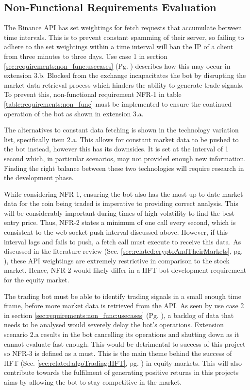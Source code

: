 \subsection{Non-Functional Requirements Evaluation}
\noindent The Binance API \cite{WEB:BINANCE_API:2018} has set weightings for fetch requests that accumulate between time intervals. This is to prevent constant spamming of their server, so failing to adhere to the set weightings within a time interval will ban the IP of a client from three minutes to three days. Use case 1 in section \ref{sec:requirements:non_func:usecases} (Pg. \pageref{sec:requirements:non_func:usecases:1}) describes how this may occur in extension 3.b. Blocked from the exchange incapacitates the bot by disrupting the market data retrieval process which hinders the ability to generate trade signals. To prevent this, non-functional requirement NFR-1 in table \ref{table:requirements:non_func} must be implemented to ensure the continued operation of the bot as shown in extension 3.a.
    
The alternatives to constant data fetching is shown in the technology variation list, specifically item 2.a. This allows for constant market data to be pushed to the bot instead, however this has its downsides. It is set at the interval of 1 second \cite{WEB:BINANCE_API:2018} which, in particular scenarios, may not provided enough new information. Finding the right balance between these two technologies will require research in the development phase.

While considering NFR-1, ensuring the bot also has the most up-to-date market data for the coin being traded is imperative to providing correct analysis. This will be considerably important during times of high volatility to find the best entry price. Thus, NFR-2 states a minimum of one call every second, which is consistent to the web socket push interval discussed above. However, if this interval lags and fails to push, a fetch call must execute to receive this data. As discussed in the literature review (Sec. \ref{sec:related:cryptoAndTheirMarkets}, pg. \pageref{sec:related:cryptoAndTheirMarkets}), these API weightings are extremely restrictive in comparison to the stock market. Hence, NFR-2 would likely differ in a HFT bot development requirement for the equity market. 

The trading bot must be able to identify trading signals in a small enough time frame, before more market data is retrieved from the API. As seen by use case 2 in section \ref{sec:requirements:non_func:usecases} (Pg. \pageref{sec:requirements:non_func:usecases:2}), a backlog of data that needs to be analysed would severely delay the bot's operations. Extension scenario 2.a results in the bot cancelling its operations and shutting down as it cannot evaluate fast enough. This would be detrimental to success of this project so NFR-3 is defined as a must.  This is the main theme behind the success of HFT (Sec. \ref{sec:related:algoTrading:HFT}, pg. \pageref{sec:related:algoTrading:HFT}) in equity markets. This will also contribute towards the fulfilment of generating positive returns in this projects aims by allowing the bot to stay competitive in the market.

